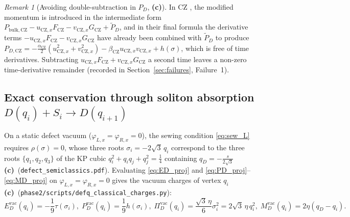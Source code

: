 \documentclass[11pt,a4paper]{article}
\newcommand{\Lc}{\textsf{\textbf{(c)}}}
\newcommand{\sclass}{\texttt{phase2/\allowbreak scripts/\allowbreak defq\_\allowbreak classical\_\allowbreak charges.py}}
\theoremstyle{remark}
\newtheorem{remark}[proposition]{Remark}
\begin{document}
\begin{remark}[Avoiding double-subtraction in $P_D$, \Lc]
In CZ \cite[(3.11)]{CZ}, the modified momentum is introduced in the intermediate
form $P_{\mathrm{bulk},\mathrm{CZ}} - u_{\mathrm{CZ},x}F_{\mathrm{CZ}} - v_{\mathrm{CZ},x}G_{\mathrm{CZ}} + \tilde{P}_D$,
and in their final formula \cite[(3.49)]{CZ} the derivative terms
$-u_{\mathrm{CZ},x}F_{\mathrm{CZ}} - v_{\mathrm{CZ},x}G_{\mathrm{CZ}}$ have
already been combined with $\tilde{P}_D$ to produce
$P_{D,\mathrm{CZ}} = -\frac{\alpha_{\mathrm{CZ}}}{2}(u_{\mathrm{CZ},x}^2+v_{\mathrm{CZ},x}^2) - \beta_{\mathrm{CZ}}u_{\mathrm{CZ},x}v_{\mathrm{CZ},x} + h(\sigma)$,
which is free of time derivatives. Subtracting $u_{\mathrm{CZ},x}F_{\mathrm{CZ}} + v_{\mathrm{CZ},x}G_{\mathrm{CZ}}$
a second time leaves a non-zero time-derivative remainder (recorded in
Section~\ref{sec:failures}, Failure~1).
\end{remark}

\subsection{Exact conservation through soliton absorption \texorpdfstring{$D(q_i) + S_i \to D(q_{i+1})$}{D(q\_i) + S\_i -> D(q\_{i+1})}}

On a static defect vacuum ($\varphi_{L,x} = \varphi_{R,x} = 0$), the sewing
condition \eqref{eq:sew_L} requires $\rho(\sigma) = 0$, whose three roots
$\sigma_i = -2\sqrt{3}\,q_i$ correspond to the three roots $\{q_1,q_2,q_3\}$ of
the KP cubic $q_i^2 + q_i q_j + q_j^2 = \frac{1}{4}$ containing $q_D = -\frac{s}{2\sqrt{3}}$
\Lc\ (\texttt{defect\_semiclassics.pdf}). Evaluating \eqref{eq:ED_proj} and
\eqref{eq:PD_proj}--\eqref{eq:MD_proj} on $\varphi_{L,x}=\varphi_{R,x}=0$ gives
the vacuum charges of vertex $q_i$ \Lc\ (\sclass):
\begin{equation}\label{eq:vac_charges}
  E_D^{\mathrm{vac}}(q_i) = -\frac{1}{9}\tau(\sigma_i), \;
  P_D^{\mathrm{vac}}(q_i) = \frac{1}{9}h(\sigma_i), \;
  \Pi_D^{\mathrm{vac}}(q_i) = \frac{\sqrt{3}\,\eta}{6}\sigma_i^2 = 2\sqrt{3}\,\eta\,q_i^2, \;
  M_D^{\mathrm{vac}}(q_i) = 2\eta(q_D - q_i).
\end{equation}
\end{document}
